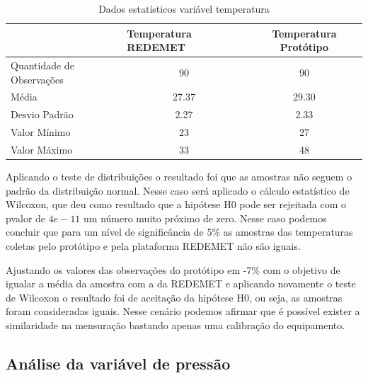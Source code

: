 \begin{table}[!h]
\centering
\begin{tabular}{l|c|c|}
\cline{2-3}
                                                & \multicolumn{1}{l|}{\textbf{Temperatura REDEMET}} & \textbf{Temperatura Protótipo} \\ \hline
\multicolumn{1}{|l|}{Quantidade de Observações} & 90                                                & 90                             \\ \hline
\multicolumn{1}{|l|}{Média}                     & 27.37                                             & 29.30                          \\ \hline
\multicolumn{1}{|l|}{Desvio Padrão}             & 2.27                                              & 2.33                           \\ \hline
\multicolumn{1}{|l|}{Valor Mínimo}              & 23                                                & 27                             \\ \hline
\multicolumn{1}{|l|}{Valor Máximo}              & 33                                                & 48                             \\ \hline
\end{tabular}
\caption{Dados estatísticos variável temperatura}
\label{tab:est_desc_temp_prot}
\end{table}

\setlength\parindent{2em}
Aplicando o teste de distribuições o resultado foi que as amostras não seguem o padrão da distribuição normal. Nesse caso será aplicado o cálculo estatístico de Wilcoxon, que deu como resultado que a hipótese H0 pode ser rejeitada com o pvalor de $4e-11$ um número muito próximo de zero. Nesse caso podemos concluir que para um nível de significância de 5\% as amostras das temperaturas coletas pelo protótipo e pela plataforma REDEMET não são iguais.

Ajustando os valores das observações do protótipo em -7\% com o objetivo de igualar a média da amostra com a da REDEMET e aplicando novamente o teste de Wilcoxon o resultado foi de aceitação da hipótese H0, ou seja, as amostras foram consideradas iguais. Nesse cenário podemos afirmar que é possível exister a similaridade na mensuração bastando apenas uma calibração do equipamento. 


\subsection{Análise da variável de pressão}

